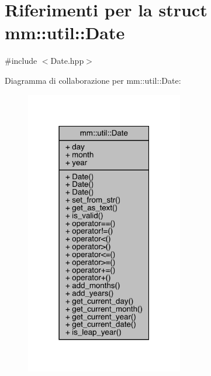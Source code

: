 \hypertarget{structmm_1_1util_1_1_date}{}\section{Riferimenti per la struct mm\+:\+:util\+:\+:Date}
\label{structmm_1_1util_1_1_date}


{\ttfamily \#include $<$Date.\+hpp$>$}



Diagramma di collaborazione per mm\+:\+:util\+:\+:Date\+:\nopagebreak
\begin{figure}[H]
\begin{center}
\leavevmode
\includegraphics[width=195pt]{d4/d70/structmm_1_1util_1_1_date__coll__graph}
\end{center}
\end{figure}
